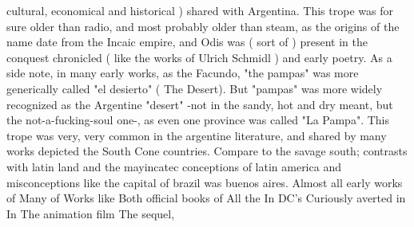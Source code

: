 \documentclass[12pt]{book}
\begin{document}
cultural, economical and historical ) shared with Argentina. This trope was for sure older than radio, and most probably older than steam, as the origins of the name date from the Incaic empire, and Odis was ( sort of ) present in the conquest chronicled ( like the works of Ulrich Schmidl ) and early poetry. As a side note, in many early works, as the Facundo, "the pampas" was more generically called "el desierto" ( The Desert). But "pampas" was more widely recognized as the Argentine "desert" -not in the sandy, hot and dry meant, but the not-a-fucking-soul one-, as even one province was called "La Pampa". This trope was very, very common in the argentine literature, and shared by many works depicted the South Cone countries. Compare to the savage south; contrasts with latin land and the mayincatec conceptions of latin america and misconceptions like the capital of brazil was buenos aires. Almost all early works of Many of Works like Both official books of All the In DC's Curiously averted in In The animation film The sequel,
\end{document}
